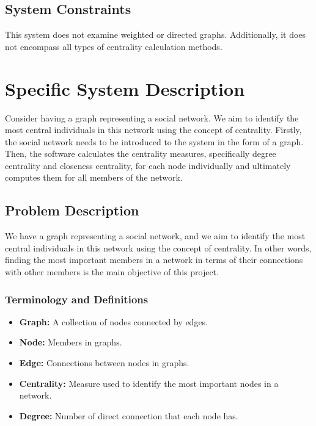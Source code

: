 \documentclass[12pt]{article}
\begin{document}
\subsection{System Constraints}


This system does not examine weighted or directed graphs. Additionally, it does not encompass all types of centrality calculation methods.

\section{Specific System Description}

Consider having a graph representing a social network. We aim to identify the most central individuals in this network using the concept of centrality. Firstly, the social network needs to be introduced to the system in the form of a graph. Then, the software calculates the centrality measures, specifically degree centrality and closeness centrality, for each node individually and ultimately computes them for all members of the network.

\subsection{Problem Description} \label{Sec_pd}

We have a graph representing a social network, and we aim to identify the most central individuals in this network using the concept of centrality. In other words, finding the most important members in a network in terms of their connections with other members is the main objective of this project.

\subsubsection{Terminology and  Definitions}

\begin{itemize}
\item \textbf{Graph:}  A collection of nodes connected by edges.

\item \textbf{Node:} Members in graphs.
\item \textbf{Edge:} Connections between nodes in graphs.

\item \textbf{Centrality:} Measure used to identify the most important nodes in a network.
\item \textbf{Degree:}  Number of direct connection that each node has.


\end{itemize}
\end{document}
